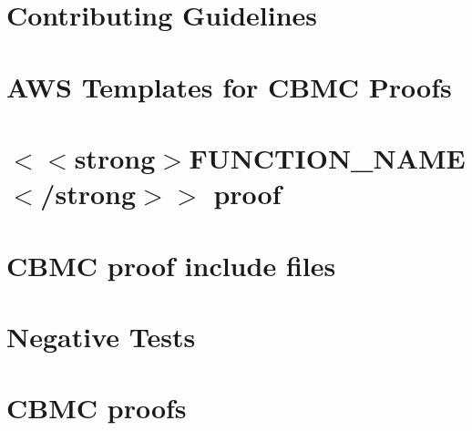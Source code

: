 \documentclass[twoside]{book}
\newcommand{\+}{\discretionary{\mbox{\scriptsize$\hookleftarrow$}}{}{}}
\begin{document}
\chapter{Contributing Guidelines}
\label{md_crt_aws_crt_cpp_crt_s2n_tests_cbmc_templates__c_o_n_t_r_i_b_u_t_i_n_g}

\chapter{AWS Templates for CBMC Proofs}
\label{md_crt_aws_crt_cpp_crt_s2n_tests_cbmc_templates__r_e_a_d_m_e}

\chapter{\texorpdfstring{$<$}{<}\texorpdfstring{$<$}{<}strong\texorpdfstring{$>$}{>}FUNCTION\+\_\+\+NAME\texorpdfstring{$<$}{<}/strong\texorpdfstring{$>$}{>}\texorpdfstring{$>$}{>} proof}
\label{md_crt_aws_crt_cpp_crt_s2n_tests_cbmc_templates_template_for_proof__r_e_a_d_m_e}

\chapter{CBMC proof include files}
\label{md_crt_aws_crt_cpp_crt_s2n_tests_cbmc_templates_template_for_repository_include__r_e_a_d_m_e}

\chapter{Negative Tests}
\label{md_crt_aws_crt_cpp_crt_s2n_tests_cbmc_templates_template_for_repository_negative_tests__r_e_a_d_m_e}

\chapter{CBMC proofs}
\label{md_crt_aws_crt_cpp_crt_s2n_tests_cbmc_templates_template_for_repository_proofs__r_e_a_d_m_e}

\end{document}
